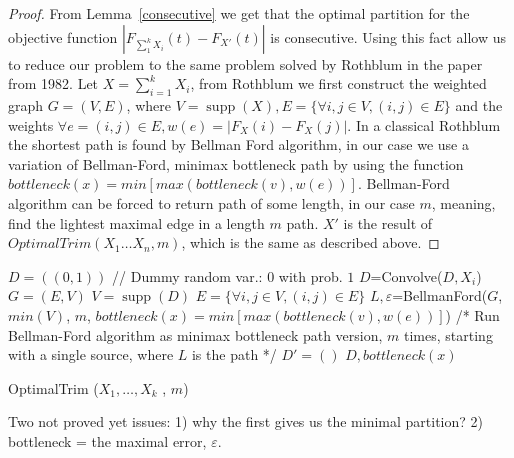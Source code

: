 \documentclass[review]{elsarticle}
\DeclareMathOperator{\support}{supp}
\begin{document}
\begin{proof}
From Lemma~\ref{consecutive} we get that the optimal partition for the objective function $|F_{\sum_1^k X_i}(t)-F_{X'}(t)|$ is consecutive.
Using this fact allow us to reduce our problem to the same problem solved by Rothblum in the paper from 1982. Let $X = \sum_{i=1}^k X_i$, from Rothblum we first construct the weighted graph $G = (V,E)$, where $V = \support(X), E = \{\forall i,j \in V, (i,j)\in E\}$ and the weights $\forall e=(i,j)\in E, w(e) = |F_{X}(i)-F_{X}(j)|$. In a classical Rothblum the shortest path is found by Bellman Ford algorithm, in our case we use a variation of Bellman-Ford, minimax bottleneck path by using the function $bottleneck(x) =    min   [max(bottleneck(v),w(e))]$. Bellman-Ford algorithm can be forced to return path of some length, in our case $m$, meaning, find the lightest maximal edge in a length $m$ path. 
$X'$ is the result of $OptimalTrim(X_1 \dots X_n,m)$, which is the same as described above. 
\end{proof}

\begin{algorithm}
  \DontPrintSemicolon

   $D=((0,1))$ //  Dummy random var.: $0$ with prob. $1$ \;
   {
	$D$=Convolve($D, X_i$)\; 
	}
   $G=(E,V)$ \;
   $V = \support(D)$\;
   $E = \{\forall i,j \in V, (i,j)\in E\}$\;
   $L, \varepsilon$=BellmanFord($G$, $min(V)$, $m$, $bottleneck(x) =    min   [max(bottleneck(v),w(e))]$) /* Run Bellman-Ford algorithm as minimax bottleneck path version, $m$ times, starting with a single source, where $L$ is the path */ \;
   $D'=()$\;
   \Return $D, bottleneck(x)$\;
     
\caption{OptimalTrim ($X_1,\dots,X_k$ , $m$)}  
\label{alg:sequence}
\end{algorithm}


Two not proved yet issues:
1) why the first gives us the minimal partition? 2) bottleneck  = the maximal error, $\varepsilon$.
\end{document}
